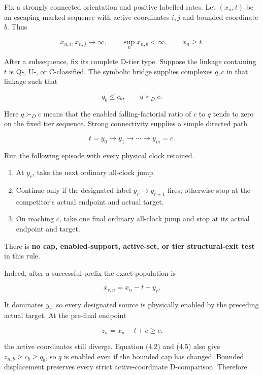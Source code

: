 Fix a strongly connected orientation and positive labelled rates. Let
\((x_n,t)\) be an escaping marked sequence with active coordinates
\(i,j\) and bounded coordinate \(b\). Thus

\[
                  x_{n,i},x_{n,j}\longrightarrow\infty,
                  \qquad \sup_nx_{n,b}<\infty,
                  \qquad x_n\ge t.                   \tag{4.1}
\]

After a subsequence, fix its complete D-tier type. Suppose the linkage
containing \(t\) is Q-, U-, or C-classified. The symbolic bridge
supplies complexes \(q,c\) in that linkage such that

\[
                  q_b\le c_b,\qquad q\succ_D c.       \tag{4.2}
\]

Here \(q\succ_Dc\) means that the enabled falling-factorial ratio of
\(c\) to \(q\) tends to zero on the fixed tier sequence. Strong
connectivity supplies a simple directed path

\[
              t=y_0\longrightarrow y_1\longrightarrow\cdots
                    \longrightarrow y_m=c.            \tag{4.3}
\]

Run the following episode with every physical clock retained.

\begin{enumerate}
\def\labelenumi{\arabic{enumi}.}
\tightlist
\item
  At \(y_r\), take the next ordinary all-clock jump.
\item
  Continue only if the designated label \(y_r\to y_{r+1}\) fires;
  otherwise stop at the competitor's actual endpoint and actual target.
\item
  On reaching \(c\), take one final ordinary all-clock jump and stop at
  its actual endpoint and target.
\end{enumerate}

There is \textbf{no cap, enabled-support, active-set, or tier
structural-exit test} in this rule.

Indeed, after a successful prefix the exact population is

\[
                           x_{r,n}=x_n-t+y_r.          \tag{4.4}
\]

It dominates \(y_r\), so every designated source is physically enabled
by the preceding actual target. At the pre-final endpoint

\[
                           z_n=x_n-t+c\ge c.           \tag{4.5}
\]

the active coordinates still diverge. Equation (4.2) and (4.5) also give
\(z_{n,b}\ge c_b\ge q_b\), so \(q\) is enabled even if the bounded cap
has changed. Bounded displacement preserves every strict
active-coordinate D-comparison. Therefore

